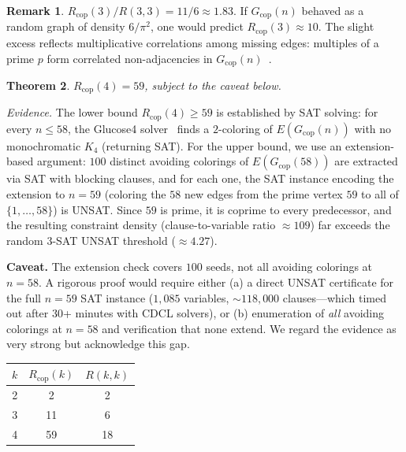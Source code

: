 \documentclass[11pt]{article}
\theoremstyle{plain}
\newtheorem{theorem}{Theorem}[section]
\theoremstyle{definition}
\newtheorem{remark}[theorem]{Remark}
\newcommand{\Rcop}{R_{\mathrm{cop}}}
\newcommand{\Gcop}{G_{\mathrm{cop}}}
\begin{document}
\begin{remark}\label{rem:ratio3}
$\Rcop(3)/R(3,3)=11/6\approx 1.83$. If $\Gcop(n)$ behaved as a random
graph of density $6/\pi^2$, one would predict $\Rcop(3)\approx 10$. The
slight excess reflects multiplicative correlations among missing edges:
multiples of a prime $p$ form correlated non-adjacencies in
$\Gcop(n)$~\cite{erdos1997coprime}.
\end{remark}

\begin{theorem}\label{thm:rcop4}
$\Rcop(4)=59$, subject to the caveat below.
\end{theorem}

\noindent\emph{Evidence.} The lower bound $\Rcop(4)\ge 59$ is
established by SAT solving: for every $n\le 58$, the Glucose4
solver~\cite{glucose} finds a $2$-coloring of $E(\Gcop(n))$ with no
monochromatic $K_4$ (returning SAT). For the upper bound, we use an
extension-based argument: $100$ distinct avoiding colorings of
$E(\Gcop(58))$ are extracted via SAT with blocking clauses, and for each
one, the SAT instance encoding the extension to $n=59$ (coloring the
$58$ new edges from the prime vertex $59$ to all of $\{1,\ldots,58\}$)
is UNSAT. Since $59$ is prime, it is coprime to every predecessor, and
the resulting constraint density (clause-to-variable ratio $\approx 109$)
far exceeds the random $3$-SAT UNSAT threshold ($\approx 4.27$).

\medskip
\noindent\textbf{Caveat.} The extension check covers $100$ seeds, not
all avoiding colorings at $n=58$. A rigorous proof would require either
(a) a direct UNSAT certificate for the full $n=59$ SAT instance ($1{,}085$
variables, ${\sim}118{,}000$ clauses---which timed out after $30$+
minutes with CDCL solvers), or (b) enumeration of \emph{all} avoiding
colorings at $n=58$ and verification that none extend. We regard the
evidence as very strong but acknowledge this gap.

\medskip

\begin{center}
\begin{tabular}{@{}ccc@{}}
\toprule
$k$ & $\Rcop(k)$ & $R(k,k)$ \\
\midrule
2 & 2  & 2  \\
3 & 11 & 6  \\
4 & 59\rlap{$^*$} & 18 \\
\bottomrule
\end{tabular}
\end{center}
\smallskip{}
\end{document}
